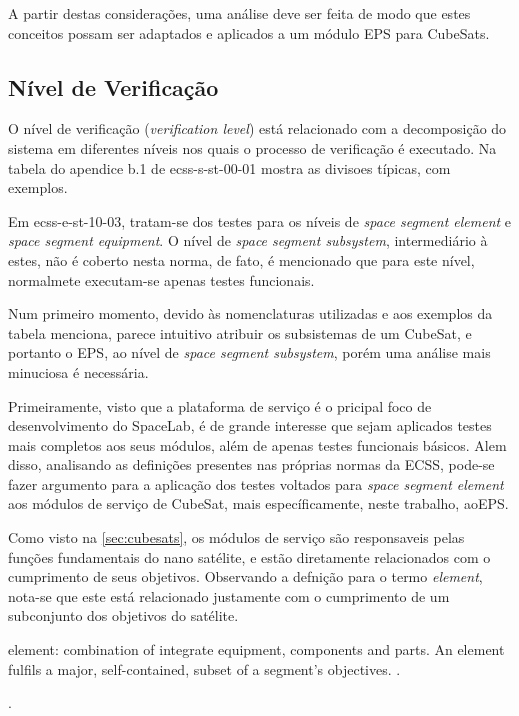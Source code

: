 A partir destas considerações, uma análise deve ser feita de modo que estes conceitos possam ser adaptados e aplicados a um módulo \gls{EPS} para CubeSats.


\subsection{Nível de Verificação} \label{sec:nivel-verificacao}


O nível de verificação (\textit{verification level}) está relacionado com a decomposição do sistema em diferentes níveis nos quais o processo de verificação é executado.
Na tabela do apendice b.1 de ecss-s-st-00-01 mostra as divisoes típicas, com exemplos.

Em ecss-e-st-10-03, tratam-se dos testes para os níveis de \textit{space segment element} e \textit{space segment equipment}. O nível de \textit{space segment subsystem}, intermediário à estes, não é coberto nesta norma, de fato, é mencionado que para este nível, normalmete executam-se apenas testes funcionais.

Num primeiro momento, devido às nomenclaturas utilizadas e aos exemplos da tabela menciona, parece intuitivo atribuir os subsistemas de um CubeSat, e portanto o \gls{EPS}, ao nível de \textit{space segment subsystem}, porém uma análise mais minuciosa é necessária.

Primeiramente, visto que a plataforma de serviço é o pricipal foco de desenvolvimento do SpaceLab, é de grande interesse que sejam aplicados testes mais completos aos seus módulos, além de apenas testes funcionais básicos.
Alem disso, analisando as definições presentes nas próprias normas da \gls{ECSS}, pode-se fazer argumento para a aplicação dos testes voltados para \textit{space segment element} aos módulos de serviço de CubeSat, mais específicamente, neste trabalho, ao\gls{EPS}.

Como visto na \autoref{sec:cubesats}, os módulos de serviço são responsaveis pelas funções fundamentais do nano satélite, e estão diretamente relacionados com o cumprimento de seus objetivos.
Observando a defnição para o termo \textit{element}, nota-se que este está relacionado justamente com o cumprimento de um subconjunto dos objetivos do satélite.

\begin{citacao}
    element: combination of integrate equipment, components and parts. An element fulfils a major, self-contained, subset of a segment's objectives. \cite[p. 9]{ecss-s-st-00-01}.
\end{citacao}.


